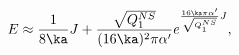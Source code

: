 \begin{equation}
E \approx \frac{1}{8\ka}J + \frac{\sqrt{Q_1^{NS}}}{(16\ka)^2\pi\alpha'}
e^{\frac{16\ka\pi\alpha'}{\sqrt{Q_1^{NS}}} J},
\end{equation}

